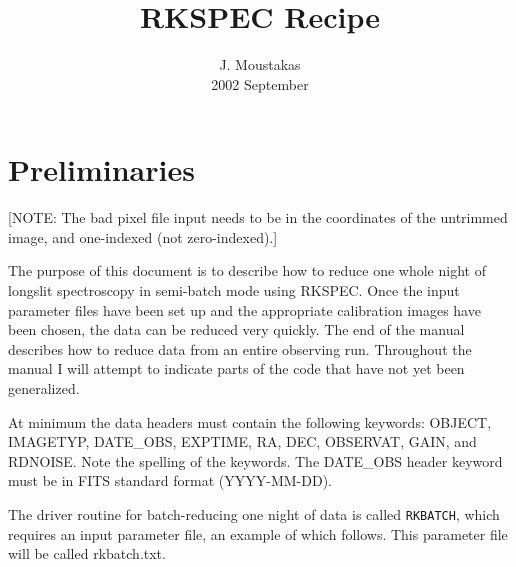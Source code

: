 \documentclass[preprint,11pt]{aastex}
\begin{document}



\title{RKSPEC Recipe}
\author{J. Moustakas \\ 2002 September}

\section{Preliminaries}

[NOTE:  The bad pixel file input needs to be in the coordinates of the
untrimmed image, and one-indexed (not zero-indexed).]



The purpose of this document is to describe how to reduce one whole
night of longslit spectroscopy in semi-batch mode using RKSPEC.  Once
the input parameter files have been set up and the appropriate
calibration images have been chosen, the data can be reduced very
quickly.  The end of the manual describes how to reduce data from an
entire observing run.  Throughout the manual I will attempt to
indicate parts of the code that have not yet been generalized.

At minimum the data headers must contain the following keywords:
OBJECT, IMAGETYP, DATE\_OBS, EXPTIME, RA, DEC, OBSERVAT,
GAIN, and RDNOISE.  Note the spelling of the keywords.  The DATE\_OBS
header keyword must be in FITS standard format (YYYY-MM-DD).

The driver routine for batch-reducing one night of data is called
{\tt RKBATCH}, which requires an input parameter file, an example of
which follows.  This parameter file will be called rkbatch.txt.
\end{document}

